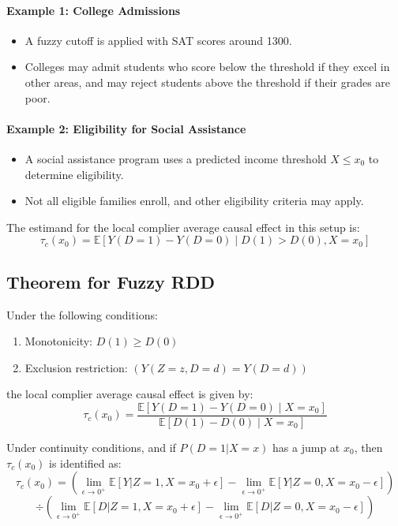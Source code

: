 \paragraph{Example 1: College Admissions}
\begin{itemize}
    \item A fuzzy cutoff is applied with SAT scores around 1300.
    \item Colleges may admit students who score below the threshold if they excel in other areas, and may reject students above the threshold if their grades are poor.
\end{itemize}

\paragraph{Example 2: Eligibility for Social Assistance}
\begin{itemize}
    \item A social assistance program uses a predicted income threshold \( X \leq x_0 \) to determine eligibility.
    \item Not all eligible families enroll, and other eligibility criteria may apply.
\end{itemize}

The estimand for the local complier average causal effect in this setup is:
\[
\tau_c(x_0) = \mathbb{E} \left[ Y(D=1) - Y(D=0) \mid D(1) > D(0), X = x_0 \right]
\]

\subsection{Theorem for Fuzzy RDD}

Under the following conditions:
\begin{enumerate}
    \item Monotonicity: \(D(1) \geq D(0)\)
    \item Exclusion restriction: \((Y(Z=z, D=d) = Y(D=d))\)
\end{enumerate}
the local complier average causal effect is given by:
\[
\tau_{c}(x_0) = \frac{\mathbb{E} \left[ Y(D=1) - Y(D=0) \mid X = x_0 \right]}{\mathbb{E} \left[ D(1) - D(0) \mid X = x_0 \right]}
\]

Under continuity conditions, and if \( P(D=1|X=x) \) has a jump at \( x_0 \), then \( \tau_c(x_0) \) is identified as:
\[
\tau_c(x_0) = (\lim_{\epsilon \to 0^+} \mathbb{E}[Y|Z=1, X=x_0+\epsilon] - \lim_{\epsilon \to 0^+} \mathbb{E}[Y|Z=0, X=x_0-\epsilon])
\]
\[
\div (\lim_{\epsilon \to 0^+} \mathbb{E}[D|Z=1, X=x_0+\epsilon] - \lim_{\epsilon \to 0^+} \mathbb{E}[D|Z=0, X=x_0-\epsilon])
\]

